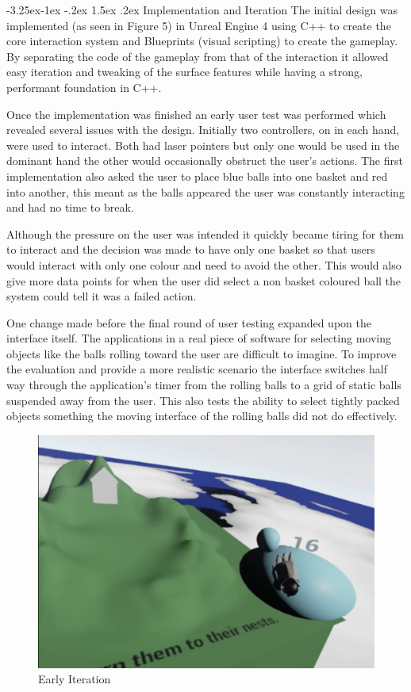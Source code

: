 \documentclass[12pt]{article}
\makeatletter
\renewcommand{\subsubsection}{\@startsection{subsubsection}{2}{\z@}%
             {-3.25ex\@plus -1ex \@minus -.2ex}%
             {1.5ex \@plus .2ex}%
             {\normalfont\normalsize\scshape\bfseries}}
\makeatother
\begin{document}
\subsubsection{Implementation and Iteration}
The initial design was implemented (as seen in Figure 5) in Unreal Engine 4 using C++ to create the core interaction system and Blueprints (visual scripting) to create the gameplay. By separating the code of the gameplay from that of the interaction it allowed easy iteration and tweaking of the surface features while having a strong, performant foundation in C++. 

Once the implementation was finished an early user test was performed which revealed several issues with the design. Initially two controllers, on in each hand, were used to interact. Both had laser pointers but only one would be used in the dominant hand the other would occasionally obstruct the user's actions. The first implementation also asked the user to place blue balls into one basket and red into another, this meant as the balls appeared the user was constantly interacting and had no time to break.

Although the pressure on the user was intended it quickly became tiring for them to interact and the decision was made to have only one basket so that users would interact with only one colour and need to avoid the other. This would also give more data points for when the user did select a non basket coloured ball the system could tell it was a failed action.

One change made before the final round of user testing expanded upon the interface itself. The applications in a real piece of software for selecting moving objects like the balls rolling toward the user are difficult to imagine. To improve the evaluation and provide a more realistic scenario the interface switches half way through the application's timer from the rolling balls to a grid of static balls suspended away from the user. This also tests the ability to select tightly packed objects something the moving interface of the rolling balls did not do effectively.

\begin{figure}
\centering
  \includegraphics[width=.8\linewidth]{earlydemo.png}
  \caption{Early Iteration}
\end{figure}
\end{document}
